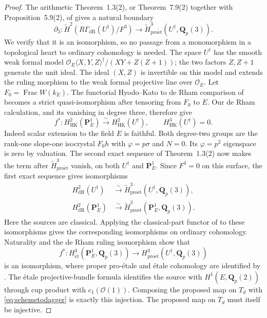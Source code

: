 \documentclass[11pt,a4paper]{article}
\theoremstyle{remark}
\newcommand{\Q}{\mathbf Q}
\newcommand{\PP}{\mathbf P}
\newcommand{\OO}{\mathcal O}
\newcommand{\Frac}{\operatorname{Frac}}
\begin{document}
\begin{proof}
The arithmetic Theorem~1.3(2), or Theorem~7.9(2) together with Proposition~5.9(2), of \cite{ColmezNiziol} gives a natural boundary
\[
\partial_3:\widetilde H^2(R\Gamma_{\mathrm{dR}}(U^\dagger)/F^3)
\longrightarrow\widetilde H^3_{\mathrm{pro\acute et}}(U^\dagger,\Q_p(3)).
\]
We verify that it is an isomorphism, so no passage from a monomorphism in a topological heart to ordinary cohomology is needed. The space $U^\dagger$ has the smooth weak formal model
$\OO_E\langle X,Y,Z\rangle^\dagger/(XY+Z(Z+1))$; the two factors $Z,Z+1$ generate the unit ideal. The ideal $(X,Z)$ is invertible on this model and extends the ruling morphism to the weak formal projective line over $\OO_E$. Let $F_0=\Frac W(k_E)$. The functorial Hyodo--Kato to de Rham comparison of \cite[equation~(5.4) and Propositions~5.5--5.6]{ColmezNiziol} becomes a strict quasi-isomorphism after tensoring from $F_0$ to $E$. Our de Rham calculation, and its vanishing in degree three, therefore give
\[
f^*:H^2_{\mathrm{HK}}(\PP^1_E)\xrightarrow{\sim}H^2_{\mathrm{HK}}(U^\dagger),
\qquad H^3_{\mathrm{HK}}(U^\dagger)=0.
\]
Indeed scalar extension to the field $E$ is faithful. Both degree-two groups are the rank-one slope-one isocrystal $F_0h$ with $\varphi=p\sigma$ and $N=0$. Its $\varphi=p^2$ eigenspace is zero by valuation. The second exact sequence of Theorem~1.3(2) now makes the term after $\widetilde H^3_{\mathrm{pro\acute et}}$ vanish, on both $U^\dagger$ and $\PP^1_E$. Since $F^3=0$ on this surface, the first exact sequence gives isomorphisms
\begin{align*}
H^2_{\mathrm{dR}}(U^\dagger)&\xrightarrow{\sim}\widetilde H^3_{\mathrm{pro\acute et}}(U^\dagger,\Q_p(3)),\\
H^2_{\mathrm{dR}}(\PP^1_E)&\xrightarrow{\sim}\widetilde H^3_{\mathrm{pro\acute et}}(\PP^1_E,\Q_p(3)).
\end{align*}
Here the sources are classical. Applying the classical-part functor of \cite[Section~3.1.1]{ColmezNiziol} to these isomorphisms gives the corresponding isomorphisms on ordinary cohomology. Naturality and the de Rham ruling isomorphism show that
\[
f^*:H^3_{\mathrm{\acute et}}(\PP^1_E,\Q_p(3))
\longrightarrow H^3_{\mathrm{pro\acute et}}(U^\dagger,\Q_p(3))
\]
is an isomorphism, where proper pro-\'etale and \'etale cohomology are identified by \cite[Section~7.2.4]{ColmezNiziol}. The \'etale projective-bundle formula identifies the source with $H^1(E,\Q_p(2))$ through cup product with $c_1(\OO(1))$. Composing the proposed map on $T_d$ with \eqref{eq:schemetodagger} is exactly this injection. The proposed map on $T_d$ must itself be injective.
\end{proof}
\end{document}
